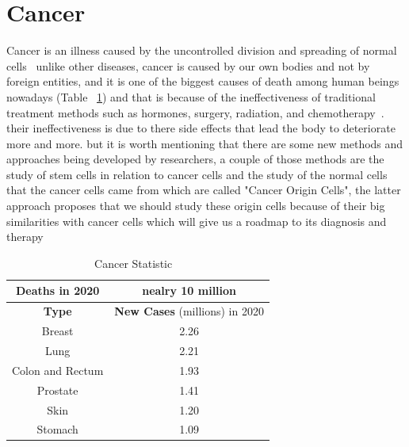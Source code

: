 \section{Cancer}
        Cancer is an illness caused by the uncontrolled division and spreading of normal cells~\cite{whatiscancer2021} unlike other diseases, cancer is caused by our own bodies and not by foreign entities, and it is one of the biggest causes of death among human beings nowadays (Table ~\ref{tab:cancerStat}) and that is because of the ineffectiveness of traditional treatment methods such as hormones, surgery, radiation, and chemotherapy~\cite{mahsa2022}. their ineffectiveness is due to there side effects that lead the body to deteriorate more and more. but it is worth mentioning that there are some new methods and approaches being developed by researchers, a couple of those methods are the study of stem cells in relation to cancer cells and the study of the normal cells that the cancer cells came from which are called "Cancer Origin Cells", the latter approach proposes that we should study these origin cells because of their big similarities with cancer cells which will give us a roadmap to its diagnosis and therapy~\cite{rachita2021} 
\begin{table}[htbp]
\begin{center}
\begin{tabular}{|c||c|}
Deaths in 2020 & nealry 10 million \\
\hline
\textbf{Type} & \textbf{New Cases} (millions) in 2020 \\
\hline
Breast &  2.26\\
\hline
Lung &  2.21\\
\hline
Colon and Rectum & 1.93 \\
\hline
Prostate & 1.41 \\
\hline
Skin &  1.20 \\
\hline
Stomach & 1.09 \\
\end{tabular}
\end{center}
\caption{Cancer Statistic ~\cite{cancerStat}}
\label{tab:cancerStat}
\end{table}
